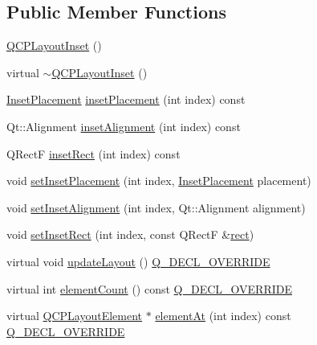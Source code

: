 \subsection*{Public Member Functions}
\begin{DoxyCompactItemize}
\item 
\mbox{\hyperlink{class_q_c_p_layout_inset_a3ad984f3221735374cc5dee14356a7dd}{Q\+C\+P\+Layout\+Inset}} ()
\item 
virtual \mbox{\hyperlink{class_q_c_p_layout_inset_a7d0e5647b2e92df92abab532441db112}{$\sim$\+Q\+C\+P\+Layout\+Inset}} ()
\item 
\mbox{\hyperlink{class_q_c_p_layout_inset_a8b9e17d9a2768293d2a7d72f5e298192}{Inset\+Placement}} \mbox{\hyperlink{class_q_c_p_layout_inset_a6fcbd74ebbc45bfe64c604b2791aa57f}{inset\+Placement}} (int index) const
\item 
Qt\+::\+Alignment \mbox{\hyperlink{class_q_c_p_layout_inset_a5b33b66f0abbb4a7cc2f8aa6c94cf7f8}{inset\+Alignment}} (int index) const
\item 
Q\+RectF \mbox{\hyperlink{class_q_c_p_layout_inset_ab23099a46af17c31f4c40668f13c9de1}{inset\+Rect}} (int index) const
\item 
void \mbox{\hyperlink{class_q_c_p_layout_inset_a63298830744d5d8c5345511c00fd2144}{set\+Inset\+Placement}} (int index, \mbox{\hyperlink{class_q_c_p_layout_inset_a8b9e17d9a2768293d2a7d72f5e298192}{Inset\+Placement}} placement)
\item 
void \mbox{\hyperlink{class_q_c_p_layout_inset_a62882a4f9ad58bb0f53da12fde022abe}{set\+Inset\+Alignment}} (int index, Qt\+::\+Alignment alignment)
\item 
void \mbox{\hyperlink{class_q_c_p_layout_inset_aa487c8378a6f9533567a2e6430099dc3}{set\+Inset\+Rect}} (int index, const Q\+RectF \&\mbox{\hyperlink{class_q_c_p_layout_element_a208effccfe2cca4a0eaf9393e60f2dd4}{rect}})
\item 
virtual void \mbox{\hyperlink{class_q_c_p_layout_inset_a493526b922ea66a75c45ef1842446988}{update\+Layout}} () \mbox{\hyperlink{qcustomplot_8h_a42cc5eaeb25b85f8b52d2a4b94c56f55}{Q\+\_\+\+D\+E\+C\+L\+\_\+\+O\+V\+E\+R\+R\+I\+DE}}
\item 
virtual int \mbox{\hyperlink{class_q_c_p_layout_inset_a7f5aa4d48a2e844cfe6dd7ed8f0861df}{element\+Count}} () const \mbox{\hyperlink{qcustomplot_8h_a42cc5eaeb25b85f8b52d2a4b94c56f55}{Q\+\_\+\+D\+E\+C\+L\+\_\+\+O\+V\+E\+R\+R\+I\+DE}}
\item 
virtual \mbox{\hyperlink{class_q_c_p_layout_element}{Q\+C\+P\+Layout\+Element}} $\ast$ \mbox{\hyperlink{class_q_c_p_layout_inset_a881ca205605bae9c034733b808f93a02}{element\+At}} (int index) const \mbox{\hyperlink{qcustomplot_8h_a42cc5eaeb25b85f8b52d2a4b94c56f55}{Q\+\_\+\+D\+E\+C\+L\+\_\+\+O\+V\+E\+R\+R\+I\+DE}}

\end{DoxyCompactItemize}
